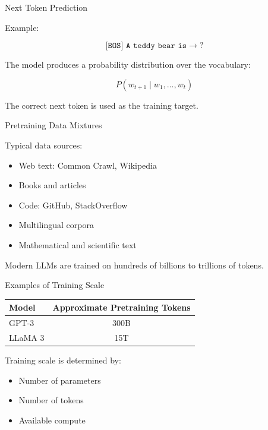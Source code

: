 \documentclass[aspectratio=169]{beamer}
\begin{document}
\begin{frame}{Next Token Prediction}

Example:

\[
\texttt{[BOS] A teddy bear is}
\rightarrow
?
\]

\vspace{0.5cm}

The model produces a probability distribution over the vocabulary:

\[
P(w_{t+1} \mid w_1,\ldots,w_t)
\]

\vspace{0.4cm}

The correct next token is used as the training target.

\end{frame}

\begin{frame}{Pretraining Data Mixtures}

Typical data sources:

\begin{itemize}
    \item Web text: Common Crawl, Wikipedia
    \item Books and articles
    \item Code: GitHub, StackOverflow
    \item Multilingual corpora
    \item Mathematical and scientific text
\end{itemize}

\vspace{0.5cm}

Modern LLMs are trained on hundreds of billions to trillions of tokens.

\end{frame}

\begin{frame}{Examples of Training Scale}

\begin{table}
\centering
\begin{tabular}{lc}
\toprule
Model & Approximate Pretraining Tokens \\
\midrule
GPT-3 & 300B \\
LLaMA 3 & 15T \\
\bottomrule
\end{tabular}
\end{table}

\vspace{0.5cm}

Training scale is determined by:

\begin{itemize}
    \item Number of parameters
    \item Number of tokens
    \item Available compute
\end{itemize}

\end{frame}
\end{document}
